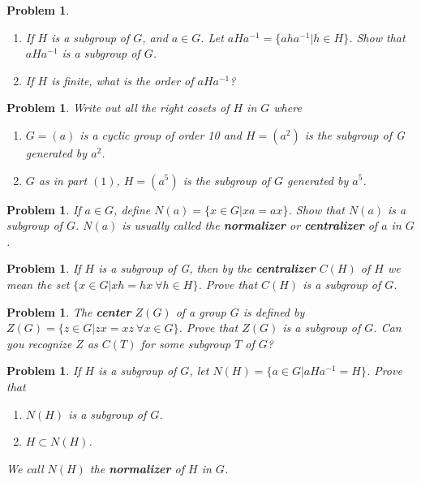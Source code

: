 \documentclass[12pt]{amsart}
\newtheorem{prob}[thm]{Problem}
\theoremstyle{definition}
\theoremstyle{remark}
\numberwithin{equation}{section}
\begin{document}
\begin{prob}
	\begin{enumerate}
		\item If $H$ is a subgroup of $G$, and $a \in G$. Let $aHa^{-1}=\{ aha^{-1}| h\in H\}$.
		Show that $aHa^{-1}$ is a subgroup of $G$.
		\item If $H$ is finite, what is the order of $aHa^{-1}$? 
	\end{enumerate}

\end{prob}

\begin{prob}
	Write out all the right cosets of $H$ in $G$ where
	\begin{enumerate}
\item $G = (a)$ is a cyclic group of order 10 and $H = (a^2)$ is the
subgroup of G generated by $a^2$. 
\item $G$ as in part $(1)$, $H = (a^5)$ is the subgroup of $G$ generated by $a^5$. 
	\end{enumerate}
\end{prob}

\begin{prob}
	If $a \in G$, define $N(a) = \{x \in G | xa = ax\}$. Show that $N(a)$ is a
	subgroup of $G$. $N(a)$ is usually called the {\bf normalizer} or {\bf centralizer} of
	$a$ in $G$.
\end{prob}

\begin{prob}
	 If $H$ is a subgroup of G, then by the {\bf centralizer} $C(H)$ of $H$ we mean
	the set $\{x \in  G | xh = hx \ \forall h \in H\}$. Prove that $C(H)$ is a subgroup
	of $G$. 
\end{prob}

\begin{prob}
	The {\bf center} $Z(G)$ of a group $G$ is defined by $Z(G) = \{z \in G | zx = xz\  \forall
		x \in G\}$. Prove that $Z(G)$ is a subgroup of $G$. Can you recognize $Z$ as
	$C( T)$ for some subgroup $T$ of $G$? 
\end{prob}

\begin{prob}
	If $H$ is a subgroup of $G$, let $N(H) = \{a \in G | aHa^{-1} = H\}$. Prove that
		\begin{enumerate}
			\item $N(H)$ is a subgroup of $G$.
			\item $H\subset N(H)$.
		\end{enumerate}
We call $N(H)$ the {\bf normalizer} of $H$ in $G$.
\end{prob}
\end{document}
